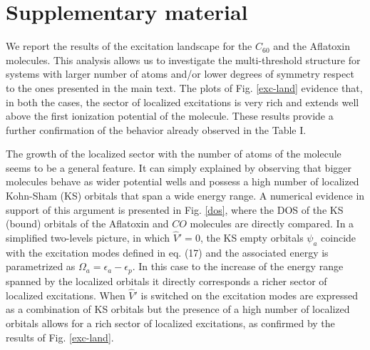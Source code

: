 \documentclass[11pt,a4paper]{article}
\newcommand{\op}[1]{\hat {#1}}
\begin{document}


\section*{Supplementary material}

We report the results of the excitation landscape for the $C_{60}$ and the Aflatoxin molecules. This analysis allows us to investigate the multi-threshold structure for systems with larger number of atoms and/or lower degrees of symmetry respect to the ones presented in the main text. The plots of Fig. \ref{exc-land} evidence that, in both the cases, the sector of localized excitations is very rich and extends well above the first ionization potential of the molecule. These results provide a further confirmation of the behavior already observed in the Table I. 

The growth of the localized sector with the number of atoms of the molecule seems to be a general feature. It can simply explained by observing that bigger molecules behave as wider potential wells and possess a high number of localized Kohn-Sham (KS) orbitals that span a wide energy range. 
A numerical evidence in support of this argument is presented in Fig. \ref{dos}, where the DOS of the KS (bound) orbitals of the Aflatoxin and $CO$ molecules are directly compared.  
In a simplified two-levels picture, in which $\op V'=0$, the KS empty orbitals $\psi_a$ coincide with the excitation modes defined in eq. (17) and the associated energy is parametrized as $\Omega_a=\epsilon_a-\epsilon_p$. In this case to the increase of the energy range spanned by the localized orbitals it directly corresponds a richer sector of localized excitations.
When $\op V'$ is switched on the excitation modes are expressed as a combination of KS orbitals but the presence of a high number of localized orbitals allows for a rich sector of localized excitations, as confirmed by the results of Fig. \ref{exc-land}.  
\end{document}
